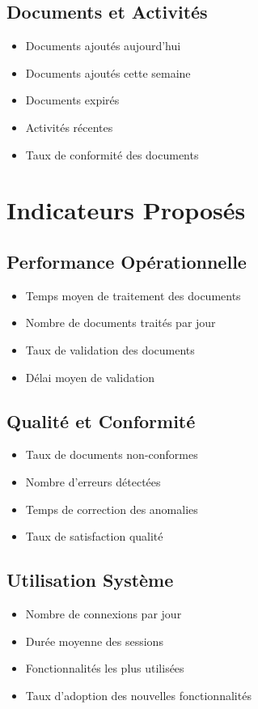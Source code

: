 \documentclass[12pt,a4paper]{article}
\begin{document}
\subsection{Documents et Activités}
\begin{itemize}
    \item Documents ajoutés aujourd'hui
    \item Documents ajoutés cette semaine
    \item Documents expirés
    \item Activités récentes
    \item Taux de conformité des documents
\end{itemize}

\section{Indicateurs Proposés}

\subsection{Performance Opérationnelle}
\begin{itemize}
    \item Temps moyen de traitement des documents
    \item Nombre de documents traités par jour
    \item Taux de validation des documents
    \item Délai moyen de validation
\end{itemize}

\subsection{Qualité et Conformité}
\begin{itemize}
    \item Taux de documents non-conformes
    \item Nombre d'erreurs détectées
    \item Temps de correction des anomalies
    \item Taux de satisfaction qualité
\end{itemize}

\subsection{Utilisation Système}
\begin{itemize}
    \item Nombre de connexions par jour
    \item Durée moyenne des sessions
    \item Fonctionnalités les plus utilisées
    \item Taux d'adoption des nouvelles fonctionnalités
\end{itemize}
\end{document}
